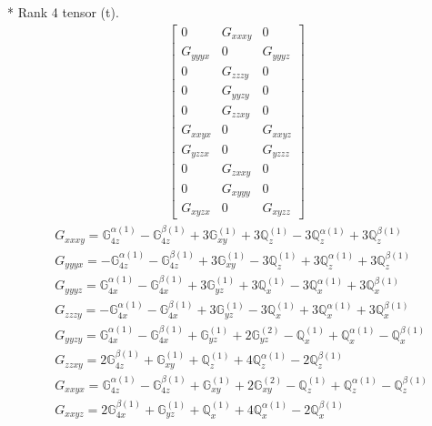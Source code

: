 \documentclass[fleqn,8pt,landscape]{jsarticle}
\begin{document}
* Rank 4 tensor (t).
\begin{align*}
\begin{bmatrix} 0 & G_{xxxy} & 0 \\ G_{yyyx} & 0 & G_{yyyz} \\ 0 & G_{zzzy} & 0 \\ 0 & G_{yyzy} & 0 \\ 0 & G_{zzxy} & 0 \\ G_{xxyx} & 0 & G_{xxyz} \\ G_{yzzx} & 0 & G_{yzzz} \\ 0 & G_{zxxy} & 0 \\ 0 & G_{xyyy} & 0 \\ G_{xyzx} & 0 & G_{xyzz} \end{bmatrix}
\end{align*}
\begin{align*}
& G_{xxxy} = \mathbb{G}_{4z}^{\alpha(1)} - \mathbb{G}_{4z}^{\beta(1)} + 3 \mathbb{G}_{xy}^{(1)} + 3 \mathbb{Q}_{z}^{(1)} - 3 \mathbb{Q}_{z}^{\alpha(1)} + 3 \mathbb{Q}_{z}^{\beta(1)} \\
& G_{yyyx} = - \mathbb{G}_{4z}^{\alpha(1)} - \mathbb{G}_{4z}^{\beta(1)} + 3 \mathbb{G}_{xy}^{(1)} - 3 \mathbb{Q}_{z}^{(1)} + 3 \mathbb{Q}_{z}^{\alpha(1)} + 3 \mathbb{Q}_{z}^{\beta(1)} \\
& G_{yyyz} = \mathbb{G}_{4x}^{\alpha(1)} - \mathbb{G}_{4x}^{\beta(1)} + 3 \mathbb{G}_{yz}^{(1)} + 3 \mathbb{Q}_{x}^{(1)} - 3 \mathbb{Q}_{x}^{\alpha(1)} + 3 \mathbb{Q}_{x}^{\beta(1)} \\
& G_{zzzy} = - \mathbb{G}_{4x}^{\alpha(1)} - \mathbb{G}_{4x}^{\beta(1)} + 3 \mathbb{G}_{yz}^{(1)} - 3 \mathbb{Q}_{x}^{(1)} + 3 \mathbb{Q}_{x}^{\alpha(1)} + 3 \mathbb{Q}_{x}^{\beta(1)} \\
& G_{yyzy} = \mathbb{G}_{4x}^{\alpha(1)} - \mathbb{G}_{4x}^{\beta(1)} + \mathbb{G}_{yz}^{(1)} + 2 \mathbb{G}_{yz}^{(2)} - \mathbb{Q}_{x}^{(1)} + \mathbb{Q}_{x}^{\alpha(1)} - \mathbb{Q}_{x}^{\beta(1)} \\
& G_{zzxy} = 2 \mathbb{G}_{4z}^{\beta(1)} + \mathbb{G}_{xy}^{(1)} + \mathbb{Q}_{z}^{(1)} + 4 \mathbb{Q}_{z}^{\alpha(1)} - 2 \mathbb{Q}_{z}^{\beta(1)} \\
& G_{xxyx} = \mathbb{G}_{4z}^{\alpha(1)} - \mathbb{G}_{4z}^{\beta(1)} + \mathbb{G}_{xy}^{(1)} + 2 \mathbb{G}_{xy}^{(2)} - \mathbb{Q}_{z}^{(1)} + \mathbb{Q}_{z}^{\alpha(1)} - \mathbb{Q}_{z}^{\beta(1)} \\
& G_{xxyz} = 2 \mathbb{G}_{4x}^{\beta(1)} + \mathbb{G}_{yz}^{(1)} + \mathbb{Q}_{x}^{(1)} + 4 \mathbb{Q}_{x}^{\alpha(1)} - 2 \mathbb{Q}_{x}^{\beta(1)} \\

\end{align*}
\end{document}
